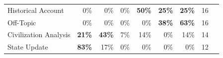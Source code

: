 \begin{table}[htbp]
\begin{tabular}{lrrrrrrrr}
    Historical Account                & 0\%                                                                            & 0\%                                                                       & 0\%                                                                           & \textbf{50\%}                                                                          & \textbf{25\%}                                                                            & \textbf{25\%}                                                                                                 & 16                                                                       \\
    Off-Topic                         & 0\%                                                                            & 0\%                                                                       & 0\%                                                                           & 0\%                                                                           & \textbf{38\%}                                                                            & \textbf{63\%}                                                                                                 & 16                                                                       \\
    Civilization Analysis             & \textbf{21\%}                                                                           & \textbf{43\%}                                                                      & 7\%                                                                           & 14\%                                                                          & 0\%                                                                             & 14\%                                                                                                 & 14                                                                       \\
    State Update                      & \textbf{83\%}                                                                           & 17\%                                                                      & 0\%                                                                           & 0\%                                                                           & 0\%                                                                             & 0\%                                                                                                  & 12                                                                       \\

\end{tabular}
\end{table}
